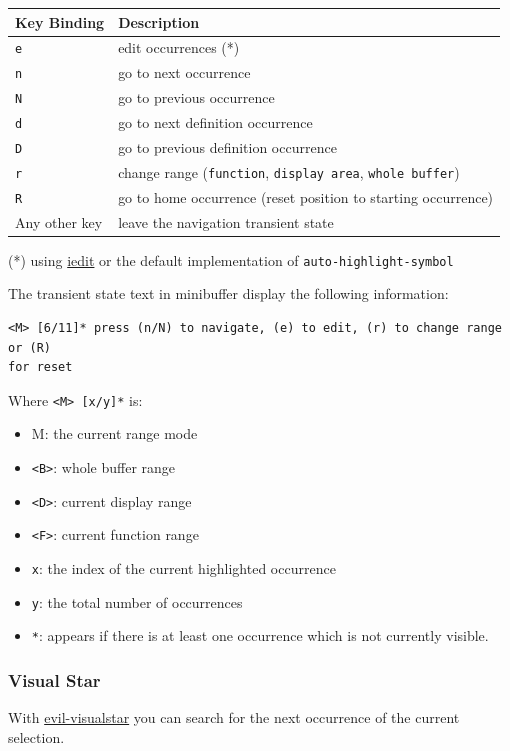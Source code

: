 \documentclass[11pt]{article}
\begin{document}
\begin{center}
\begin{tabular}{ll}
Key Binding & Description\\
\hline
\texttt{e} & edit occurrences (*)\\
\texttt{n} & go to next occurrence\\
\texttt{N} & go to previous occurrence\\
\texttt{d} & go to next definition occurrence\\
\texttt{D} & go to previous definition occurrence\\
\texttt{r} & change range (\texttt{function}, \texttt{display area}, \texttt{whole buffer})\\
\texttt{R} & go to home occurrence (reset position to starting occurrence)\\
Any other key & leave the navigation transient state\\
\end{tabular}
\end{center}

(*) using \href{https://github.com/tsdh/iedit}{iedit} or the default implementation
of \texttt{auto-highlight-symbol}

The transient state text in minibuffer display the following information:

\begin{verbatim}
<M> [6/11]* press (n/N) to navigate, (e) to edit, (r) to change range or (R)
for reset
\end{verbatim}

Where \texttt{<M> [x/y]*} is:
\begin{itemize}
\item M: the current range mode
\item \texttt{<B>}: whole buffer range
\item \texttt{<D>}: current display range
\item \texttt{<F>}: current function range
\item \texttt{x}: the index of the current highlighted occurrence
\item \texttt{y}: the total number of occurrences
\item \texttt{*}: appears if there is at least one occurrence which is not currently visible.
\end{itemize}

\subsubsection{Visual Star}
\label{sec:org98a6e7c}
With \href{https://github.com/bling/evil-visualstar}{evil-visualstar} you can search for the next occurrence of the current
selection.
\end{document}
